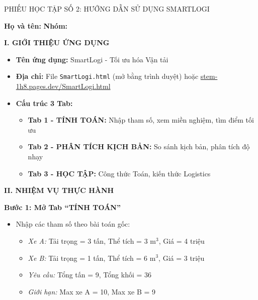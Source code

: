 \documentclass[12pt,a4paper]{article}
\begin{document}
\newpage
\begin{phieuhoctap}{PHIẾU HỌC TẬP SỐ 2: HƯỚNG DẪN SỬ DỤNG SMARTLOGI}

\noindent\textbf{Họ và tên:} \underline{\hspace{6cm}} \hfill \textbf{Nhóm:} \underline{\hspace{2cm}}

\vspace{0.5cm}
\textbf{\color{primary}I. GIỚI THIỆU ỨNG DỤNG}
\begin{itemize}
\item \textbf{Tên ứng dụng:} SmartLogi - Tối ưu hóa Vận tải
\item \textbf{Địa chỉ:} File \texttt{SmartLogi.html} (mở bằng trình duyệt) hoặc \href{https://stem-1h8.pages.dev/SmartLogi.html}{stem-1h8.pages.dev/SmartLogi.html}
\item \textbf{Cấu trúc 3 Tab:}
    \begin{itemize}
    \item \textbf{Tab 1 - TÍNH TOÁN:} Nhập tham số, xem miền nghiệm, tìm điểm tối ưu
    \item \textbf{Tab 2 - PHÂN TÍCH KỊCH BẢN:} So sánh kịch bản, phân tích độ nhạy
    \item \textbf{Tab 3 - HỌC TẬP:} Công thức Toán, kiến thức Logistics
    \end{itemize}
\end{itemize}

\vspace{0.5cm}
\textbf{\color{primary}II. NHIỆM VỤ THỰC HÀNH}

\textbf{\color{accent}Bước 1: Mở Tab ``TÍNH TOÁN''}
\begin{itemize}
\item Nhập các tham số theo bài toán gốc:
    \begin{itemize}
    \item \textit{Xe A:} Tải trọng = 3 tấn, Thể tích = 3 m$^3$, Giá = 4 triệu
    \item \textit{Xe B:} Tải trọng = 1 tấn, Thể tích = 6 m$^3$, Giá = 3 triệu
    \item \textit{Yêu cầu:} Tổng tấn = 9, Tổng khối = 36
    \item \textit{Giới hạn:} Max xe A = 10, Max xe B = 9
    \end{itemize}
\end{itemize}


\end{phieuhoctap}
\end{document}
